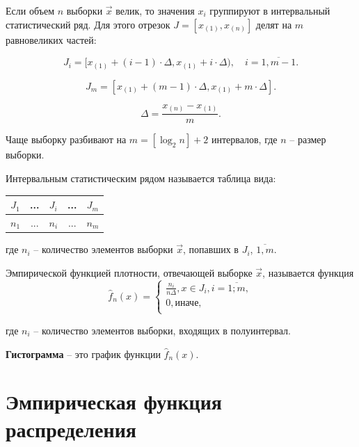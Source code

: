 Если объем $n$ выборки $\vec x$ велик, то значения $x_i$ группируют в интервальный статистический ряд. Для этого отрезок $J = [x_{(1)}, x_{(n)}]$ делят на $m$ равновеликих частей:

\begin{equation*}
 J_i = [x_{(1)} + (i - 1) \cdot \Delta, x_{(1)} + i \cdot \Delta),\quad i = \overline{1, m - 1}.
\end{equation*}

\begin{equation*}
 J_{m} = [x_{(1)} + (m - 1) \cdot \Delta, x_{(1)} + m \cdot \Delta].
\end{equation*}

\begin{equation*}
 \Delta = \frac{x_{(n)} - x_{(1)}}{m}.
\end{equation*}

\noindent Чаще выборку разбивают на $m=[\log_2n]+2$ интервалов, где $n$ -- размер выборки.

Интервальным статистическим рядом называется таблица вида:

\begin{table}[h!]
 \centering
 \begin{tabular}{|c|c|c|c|c|}
  \hline
  $J_1$ & ... & $J_i$ & ... & $J_m$ \\
  \hline
  $n_1$ & ... & $n_i$ & ... & $n_m$ \\
  \hline
 \end{tabular}
\end{table}

где $n_i$ -- количество элементов выборки $\vec x$, попавших в $J_i$, $\overline{1, m}$.

Эмпирической функцией плотности, отвечающей выборке $\vec x$, называется функция
\begin{equation}
 \hat f_n(x) =
 \begin{cases}
 \frac{n_i}{n \Delta}, x \in J_i, i = \overline{1; m}, \\
 0, \text{иначе}, \\
 \end{cases}
\end{equation}

\noindent где $n_i$ -- количество элементов выборки, входящих в полуинтервал.

\textbf{Гистограмма} -- это график функции $\hat f_n(x)$. 

\section{Эмпирическая функция распределения}


